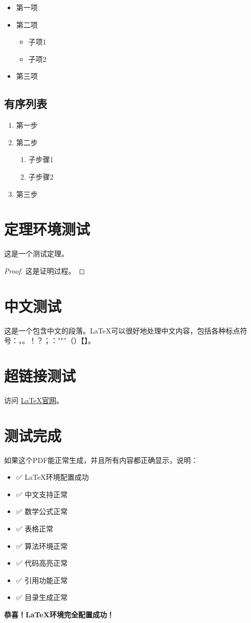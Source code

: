 \documentclass[12pt,a4paper]{article}
\begin{document}
\begin{itemize}
    \item 第一项
    \item 第二项
    \begin{itemize}
        \item 子项1
        \item 子项2
    \end{itemize}
    \item 第三项
\end{itemize}

\subsection{有序列表}

\begin{enumerate}
    \item 第一步
    \item 第二步
    \begin{enumerate}
        \item 子步骤1
        \item 子步骤2
    \end{enumerate}
    \item 第三步
\end{enumerate}

\section{定理环境测试}

\begin{theorem}
这是一个测试定理。
\end{theorem}

\begin{proof}
这是证明过程。
\end{proof}

\section{中文测试}

这是一个包含中文的段落。LaTeX可以很好地处理中文内容，包括各种标点符号：，。！？；：""''（）【】。

\section{超链接测试}

访问 \href{https://www.latex-project.org/}{LaTeX官网}。

\section{测试完成}

如果这个PDF能正常生成，并且所有内容都正确显示，说明：

\begin{itemize}
    \item ✅ LaTeX环境配置成功
    \item ✅ 中文支持正常
    \item ✅ 数学公式正常
    \item ✅ 表格正常
    \item ✅ 算法环境正常
    \item ✅ 代码高亮正常
    \item ✅ 引用功能正常
    \item ✅ 目录生成正常
\end{itemize}

\textbf{恭喜！LaTeX环境完全配置成功！} 🎉
\end{document}
